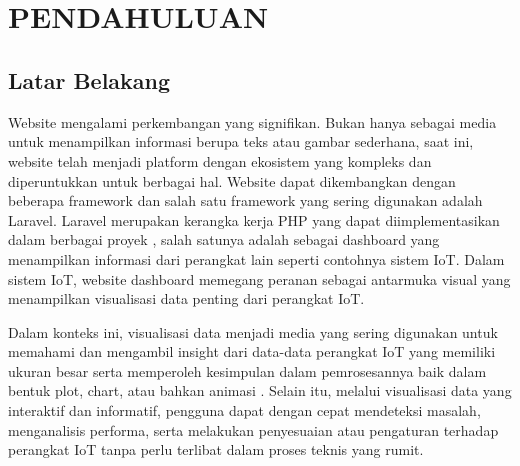 \chapter[PENDAHULUAN]{\\ PENDAHULUAN}

\section{Latar Belakang}
Website mengalami perkembangan yang signifikan. Bukan hanya sebagai media untuk menampilkan informasi berupa teks atau gambar sederhana, saat ini, website telah menjadi platform dengan ekosistem yang kompleks dan diperuntukkan untuk berbagai hal. Website dapat dikembangkan dengan beberapa framework dan salah satu framework yang sering digunakan adalah Laravel. Laravel merupakan kerangka kerja PHP yang dapat diimplementasikan dalam berbagai proyek \cite{Endra2021}, salah satunya adalah sebagai dashboard yang menampilkan informasi dari perangkat lain seperti contohnya sistem IoT. Dalam sistem IoT, website dashboard memegang peranan sebagai antarmuka visual yang menampilkan visualisasi data penting dari perangkat IoT.

Dalam konteks ini, visualisasi data menjadi media yang sering digunakan untuk memahami dan mengambil insight dari data-data perangkat IoT yang memiliki ukuran besar serta memperoleh kesimpulan dalam pemrosesannya baik dalam bentuk plot, chart, atau bahkan animasi \cite{Mundargi2023}\cite{Bostrm2022}. Selain itu, melalui visualisasi data yang interaktif dan informatif, pengguna dapat dengan cepat mendeteksi masalah, menganalisis performa, serta melakukan penyesuaian atau pengaturan terhadap perangkat IoT tanpa perlu terlibat dalam proses teknis yang rumit. 

